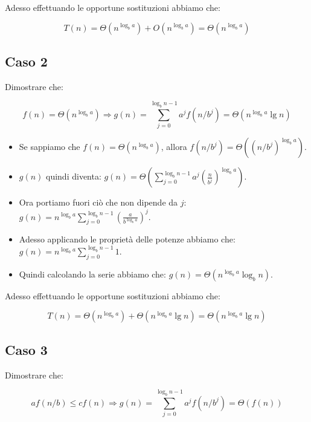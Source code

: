 \documentclass{article}
\begin{document}
Adesso effettuando le opportune sostituzioni abbiamo che:

\begin{equation*}
    T(n) = \Theta(n^{\log_{b}a}) + O(n^{\log_{b} a}) = \Theta(n^{\log_{b} a})
\end{equation*}

\subsection{Caso 2}

Dimostrare che:

\begin{equation*}
    f(n) = \Theta(n^{\log_{b}a}) \Rightarrow g(n) = \sum_{j = 0}^{\log_{b}n - 1} a^j f(n/b^j) = \Theta(n^{\log_{b} a} \lg n)
\end{equation*}

\begin{itemize}
    \item Se sappiamo che $f(n) = \Theta(n^{\log_{b} a})$, allora $f(n/b^j) = \Theta((n/b^j)^{\log_{b} a})$.
    \item $g(n)$ quindi diventa: $\displaystyle g(n) = \Theta(\sum_{j = 0}^{\log_{b}n - 1} a^j(\frac{n}{b^j})^{\log_{b} a})$.
    \item Ora portiamo fuori ciò che non dipende da $\displaystyle j$: $\displaystyle g(n) = n^{\log_{b} a} \sum_{j = 0}^{\log_{b}n - 1} (\frac{a}{b^{\log_b a}})^j$.
    \item Adesso applicando le proprietà delle potenze abbiamo che: $\displaystyle g(n) = n^{\log_{b} a} \sum_{j = 0}^{\log_{b}n - 1} 1$.
    \item Quindi calcolando la serie abbiamo che: $g(n) = \Theta(n^{\log_{b} a} \log_{b} n)$.
\end{itemize}

Adesso effettuando le opportune sostituzioni abbiamo che:

\begin{equation*}
    T(n) = \Theta(n^{\log_{b}a}) + \Theta(n^{\log_{b} a} \lg n) = \Theta(n^{\log_{b} a} \lg n)
\end{equation*}

\subsection{Caso 3}

Dimostrare che:

\begin{equation*}
    a f(n/b) \leq c f(n) \Rightarrow g(n) = \sum_{j = 0}^{\log_{b}n - 1} a^j f(n/b^j) = \Theta(f(n))
\end{equation*}
\end{document}
